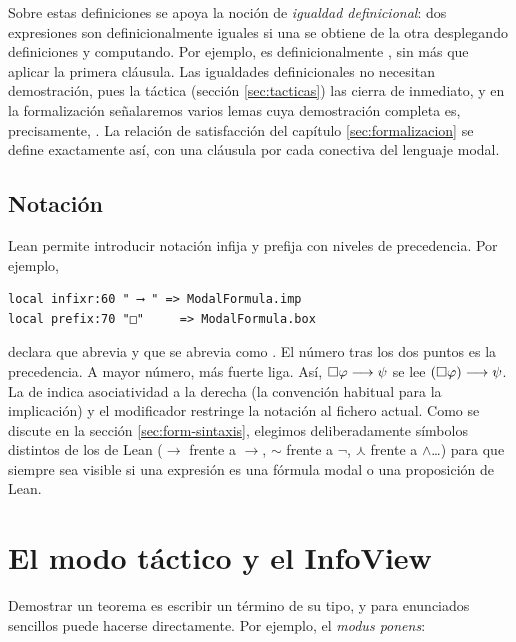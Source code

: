 Sobre estas definiciones se apoya la noción de \emph{igualdad definicional}: dos expresiones son definicionalmente iguales si una se obtiene de la otra desplegando definiciones y computando. Por ejemplo,  es definicionalmente , sin más que aplicar la primera cláusula. Las igualdades definicionales no necesitan demostración, pues la táctica  (sección \ref{sec:tacticas}) las cierra de inmediato, y en la formalización señalaremos varios lemas cuya demostración completa es, precisamente, . La relación de satisfacción del capítulo \ref{sec:formalizacion} se define exactamente así, con una cláusula por cada conectiva del lenguaje modal.

\subsection*{Notación}

Lean permite introducir notación infija y prefija con niveles de precedencia. Por ejemplo,

\begin{lstlisting}
local infixr:60 " ⟶ " => ModalFormula.imp
local prefix:70 "□"     => ModalFormula.box
\end{lstlisting}

\noindent declara que  abrevia  y que  se abrevia como . El número tras los dos puntos es la precedencia. A mayor número, más fuerte liga. Así, $\square\varphi \longrightarrow \psi$ se lee $(\square\varphi) \longrightarrow \psi$. La  de  indica asociatividad a la derecha (la convención habitual para la implicación) y el modificador  restringe la notación al fichero actual. Como se discute en la sección \ref{sec:form-sintaxis}, elegimos deliberadamente símbolos distintos de los de Lean ($\longrightarrow$ frente a $\to$, $\sim$ frente a $\lnot$, $\curlywedge$ frente a $\land$\dots) para que siempre sea visible si una expresión es una fórmula modal o una proposición de Lean.

\section{El modo táctico y el InfoView}\label{sec:modo-tactico}

Demostrar un teorema es escribir un término de su tipo, y para enunciados sencillos puede hacerse directamente. Por ejemplo, el \emph{modus ponens}:

